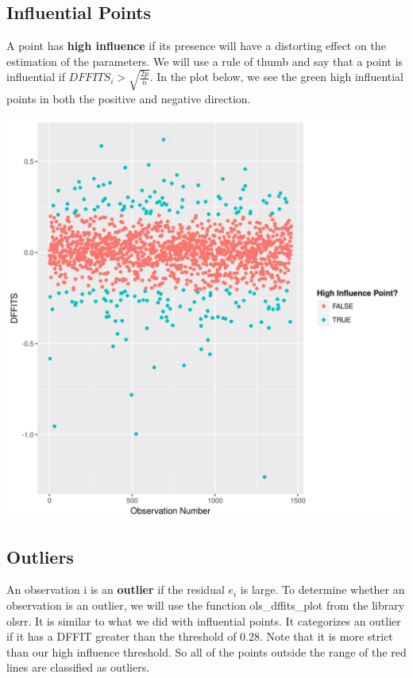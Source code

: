 \documentclass[12pt]{article}
\begin{document}
\begin{flushleft}
\begin{flushleft}
\begin{flushleft}
\subsection{Influential Points}

A point has \textbf{high influence} if its presence will have a distorting effect on the estimation of the parameters. We will use a rule of thumb and say that a point is influential if $DFFITS_{i} > \sqrt{\frac{2p}{n}}$. In the plot below, we see the green high influential points in both the positive and negative direction.

\end{flushleft}

\centering
    \vspace*{0.5 cm}
    \includegraphics[scale = .40]{influence.png}\\[1.0 cm]	

\begin{flushleft}

\subsection{Outliers}
An observation i is an \textbf{outlier} if the residual $e_{i}$ is large. To determine whether an observation is an outlier, we will use the function ols\_dffits\_plot from the library olsrr. It is similar to what we did with influential points. It categorizes an outlier if it has a DFFIT greater than the threshold of 0.28. Note that it is more strict than  our high influence threshold. So all of the points outside the range of the red lines are classified as outliers.


\end{flushleft}
\end{flushleft}
\end{flushleft}
\end{document}
